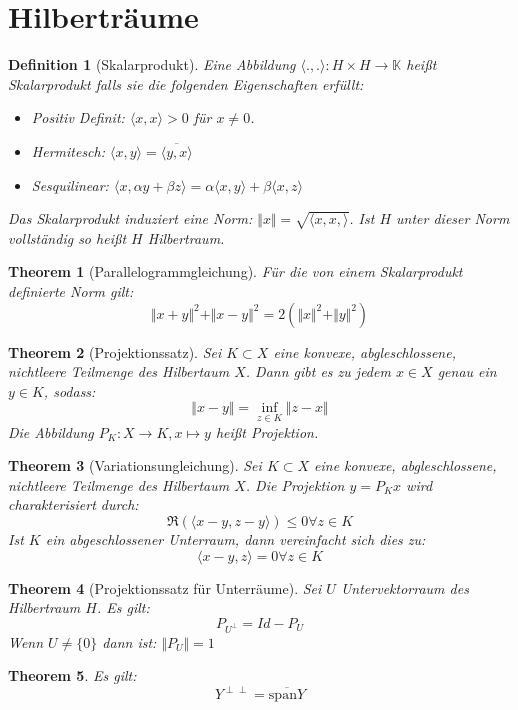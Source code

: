 \documentclass[10pt,a4paper]{article}
\newtheorem{theorem}{Theorem}
\newtheorem{definition}{Definition}
\begin{document}
\section{Hilberträume}
\begin{definition}[Skalarprodukt]
	Eine Abbildung $\langle. , . \rangle : H \times H \to \mathbb{K}$ heißt Skalarprodukt falls sie die folgenden Eigenschaften erfüllt:
	\begin{itemize}
		\item Positiv Definit: $\langle x, x\rangle > 0$ für $x\neq 0$.
		\item Hermitesch: $\langle x, y\rangle = \overline{\langle y, x \rangle}$
		\item Sesquilinear: $\langle x, \alpha y + \beta z\rangle = \alpha\langle x, y \rangle + \beta \langle x, z\rangle$
	\end{itemize}
	Das Skalarprodukt induziert eine Norm: $\Vert x\Vert = \sqrt{\langle x, x, \rangle}$. Ist $H$ unter dieser Norm vollständig so heißt $H$ Hilbertraum. 
\end{definition}
\begin{theorem}[Parallelogrammgleichung]
	Für die von einem Skalarprodukt definierte Norm gilt:
	$$\Vert x+ y \Vert^2 +\Vert x-y\Vert^2 = 2(\Vert x\Vert ^2 + \Vert y \Vert^2)$$
\end{theorem}
\begin{theorem}[Projektionssatz]
	Sei $K \subset X$ eine konvexe, abgleschlossene, nichtleere Teilmenge des Hilbertaum $X$. Dann gibt es zu jedem $x\in X$ genau ein $y\in K$, sodass:
	$$\Vert x-y\Vert = \inf_{z\in K}\Vert z - x \Vert$$
	Die Abbildung $P_K: X\to K, x\mapsto y$ heißt Projektion.
\end{theorem}
\begin{theorem}[Variationsungleichung]
	Sei $K \subset X$ eine konvexe, abgleschlossene, nichtleere Teilmenge des Hilbertaum $X$. Die Projektion $y=P_Kx$ wird charakterisiert durch:
	$$\Re(\langle x-y, z-y\rangle)\leq 0 \forall z \in K$$
	Ist $K$ ein abgeschlossener Unterraum, dann vereinfacht sich dies zu:
	$$\langle x-y, z \rangle = 0 \forall z \in K$$
\end{theorem}
\begin{theorem}[Projektionssatz für Unterräume]
	Sei $U$ Untervektorraum des Hilbertraum $H$. Es gilt:
	$$P_{U^\perp} = Id - P_U$$
	Wenn $U \neq \{0\}$ dann ist: $\Vert P_U\Vert = 1$
\end{theorem}
\begin{theorem}
	Es gilt:
	$$Y^{\perp\perp} = \overline{\text{span}Y}$$
\end{theorem}
\end{document}
